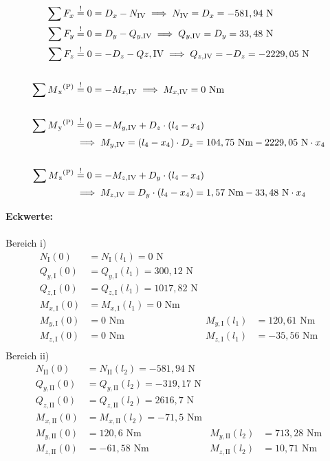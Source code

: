 \begin{enumerate}
\begin{center}
\end{center}
\begin{align*}
	\sum F_x &\overset{!}{=} 0 = D_x - N_{\mathrm{IV}} 
		\implies  N_{\mathrm{IV}} = D_x = -581,94 \text { N}\\ 
	\sum F_y &\overset{!}{=} 0 =D_y - Q_{y,\mathrm{IV}}
		\implies Q_{y,\mathrm{IV}} = D_y = 33,48 \text{ N}\\ 
	\sum F_z &\overset{!}{=} 0 = -D_z -Q{z,\mathrm{IV}} 
		\implies Q_{z,\mathrm{IV}} = -D_z = -2229,05 \text{ N} \\ \\
	\sum M\textsubscript{x}\textsuperscript{(P)} &\overset{!}{=} 0 =- M_{x,\mathrm{IV}}  
		\implies M_{x,\mathrm{IV}} = 0 \text{ Nm} \\ \\
	\sum M\textsubscript{y}\textsuperscript{(P)} &\overset{!}{=} 0 =- M_{y,\mathrm{IV}} + D_z \cdot  (l_4 - x_4) \\
		&\implies M_{y,\mathrm{IV}} =  (l_4 - x_4) \cdot D_z =104,75\text{ Nm} - 2229,05 \text{ N} \cdot x_4\\ \\
	\sum M\textsubscript{z}\textsuperscript{(P)} &\overset{!}{=} 0 = - M_{z,\mathrm{IV}} + D_y \cdot  (l_4 - x_4)  \\
		&\implies  M_{z,\mathrm{IV}} =  D_y \cdot (l_4 - x_4) = 1,57 \text{ Nm} -33,48 \text{ N} \cdot x_4
	\end{align*}
\end{enumerate}
\newpage
\textbf{Eckwerte:}\\ \\
Bereich i)
\begin{align*}
	N_{\mathrm{I}} (0) &= N_{\mathrm{I}} (l_1) = 0 \text{ N}\\
	Q_{y,\mathrm{I}} (0) &= Q_{y,\mathrm{I}} (l_1) = 300,12\text{ N}\\
	Q_{z,\mathrm{I}} (0) &= Q_{z,\mathrm{I}} (l_1) = 1017,82\text{ N}\\
	M_{x,\mathrm{I}} (0) &=  M_{x,\mathrm{I}} (l_1) = 0\text{ Nm}\\
	M_{y,\mathrm{I}} (0) &=  0\text{ Nm} & M_{y,\mathrm{I}} (l_1) &= 120,61\text{ Nm}\\
	M_{z,\mathrm{I}} (0) &= 0\text{ Nm} & M_{z,\mathrm{I}} (l_1) &= -35,56\text{ Nm}\\
\end{align*}
Bereich ii)
\begin{align*}
	N_{\mathrm{II}} (0) &= N_{\mathrm{II}} (l_2) = -581,94 \text{ N}\\
	Q_{y,\mathrm{II}} (0) &= Q_{y,\mathrm{II}} (l_2) =-319,17\text{ N}\\
	Q_{z,\mathrm{II}} (0) &= Q_{z,\mathrm{II}} (l_2) = 2616,7\text{ N}\\
	M_{x,\mathrm{II}} (0) &= M_{x,\mathrm{II}} (l_2) = -71,5\text{ Nm}\\
	M_{y,\mathrm{II}} (0) &=  120,6\text{ Nm} & M_{y,\mathrm{II}} (l_2) &= 713,28\text{ Nm}\\
	M_{z,\mathrm{II}} (0) &=  -61,58\text{ Nm} &M_{z,\mathrm{II}} (l_2) &= 10,71\text{ Nm}\\
\end{align*}
